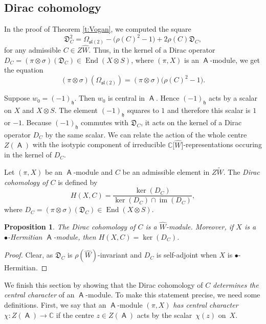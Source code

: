 \documentclass[pdftex]{sigma}
\numberwithin{equation}{section}
\newtheorem{Proposition}[Theorem]{Proposition}
 { \theoremstyle{definition}
\newtheorem{Definition}[Theorem]{Definition}
\newtheorem{Note}[Theorem]{Note}
\newtheorem{Example}[Theorem]{Example}
\newtheorem{Remark}[Theorem]{Remark} }
\DeclareMathOperator{\End}{End}
\DeclareMathOperator{\im}{im}
\newcommand{\fh}{\mathfrak{h}}
\newcommand{\fl}{\mathfrak{l}}
\newcommand{\fs}{\mathfrak{s}}
\newcommand{\bbc}{\mathbb{C}}
\DeclareMathOperator{\ama}{\mathsf{A}}
\begin{document}
\subsection{Dirac cohomology}

In the proof of Theorem \ref{t:Vogan}, we computed the square
\begin{equation}\label{e:C-Diracsquare}
 \mathfrak{D}_C^2 = \Omega_{\mathfrak{sl}(2)} - \big(\rho(C)^2 - 1\big) + 2\rho(C)\mathfrak{D}_C,
\end{equation}
for any admissible $C\in Z\hat W$. Thus, in the kernel of a Dirac operator $D_C = (\pi\otimes\sigma)(\mathfrak{D}_C) \in \End(X\otimes S)$, where $(\pi,X)$ is an $\ama$-module, we get the equation
\[
(\pi\otimes\sigma)(\Omega_{\fs\fl(2)}) = (\pi\otimes\sigma)\big(\rho(C)^2 -1\big).
\]

Suppose $w_0=(-1)_\fh$. Then $w_0$ is central in $\ama$. Hence $(-1)_\fh$ acts by a scalar on $X$ and $X \otimes S$. The element $(-1)_\fh$ squares to $1$ and therefore this scalar is $1$ or $-1$. Because $(-1)_\fh$ commutes with $\mathfrak{D}_C$, it acts on the kernel of a Dirac operator $D_C$ by the same scalar. We can relate the action of the whole centre $Z(\ama)$ with the isotypic component of irreducible $\bbc\big[\hat{W}\big]$-representations occuring in the kernel of $D_C$.

\begin{Definition}\label{d:DiracCoh}
Let $(\pi,X)$ be an $\ama$-module and $C$ be an admissible element in $Z\tilde W$. The {\it Dirac cohomology of $C$} is defined by
\[
H(X,C) = \frac{\ker(D_C)}{\ker(D_C)\cap \im(D_C)},
\]
where $D_C = (\pi\otimes\sigma)(\mathfrak{D}_C) \in \End(X\otimes S)$.
\end{Definition}

\begin{Proposition}\label{p:unitarycoh}
The Dirac cohomology of $C$ is a $\hat W$-module. Moreover, if $X$ is a $\bullet$-Hermitian $\ama$-module, then $H(X,C) = \ker(D_C)$.
\end{Proposition}

\begin{proof}
Clear, as $\mathfrak{D}_C$ is $\rho(\hat{W})$-invariant and $D_C$ is self-adjoint when $X$ is $\bullet$-Hermitian.
\end{proof}

We finish this section by showing that the Dirac cohomology of $C$ {\it determines the central character} of an $\ama$-module. To make this statement precise, we need some definitions. First, we say that an $\ama$-module $(\pi,X)$ {\it has central character $\chi\colon Z(\ama)\to \bbc$} if the centre $z \in Z(\ama)$ acts by the scalar~$\chi(z)$ on~$X$.
\end{document}
